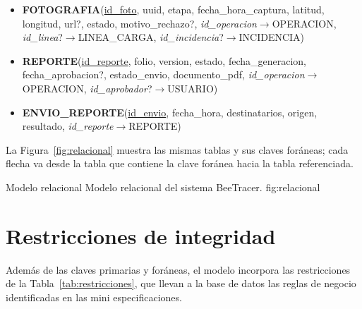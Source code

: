 {\begin{itemize}
    fecha\_hora, \textit{id\_operacion}$\rightarrow$OPERACION,
    \textit{id\_linea}?$\rightarrow$LINEA\_CARGA)
    \item \textbf{FOTOGRAFIA}(\uline{id\_foto}, uuid, etapa, fecha\_hora\_captura, latitud,
    longitud, url?, estado, motivo\_rechazo?, \textit{id\_operacion}$\rightarrow$OPERACION,
    \textit{id\_linea}?$\rightarrow$LINEA\_CARGA,
    \textit{id\_incidencia}?$\rightarrow$INCIDENCIA)
    \item \textbf{REPORTE}(\uline{id\_reporte}, folio, version, estado, fecha\_generacion,
    fecha\_aprobacion?, estado\_envio, documento\_pdf,
    \textit{id\_operacion}$\rightarrow$OPERACION, \textit{id\_aprobador}?$\rightarrow$USUARIO)
    \item \textbf{ENVIO\_REPORTE}(\uline{id\_envio}, fecha\_hora, destinatarios, origen,
    resultado, \textit{id\_reporte}$\rightarrow$REPORTE)
\end{itemize}
}

La Figura~\ref{fig:relacional} muestra las mismas tablas y sus claves foráneas; cada flecha
va desde la tabla que contiene la clave foránea hacia la tabla referenciada.

    {Modelo relacional}
    {Modelo relacional del sistema BeeTracer.}
    {fig:relacional}

\section{Restricciones de integridad}

Además de las claves primarias y foráneas, el modelo incorpora las restricciones de la
Tabla~\ref{tab:restricciones}, que llevan a la base de datos las reglas de negocio
identificadas en las mini especificaciones.

